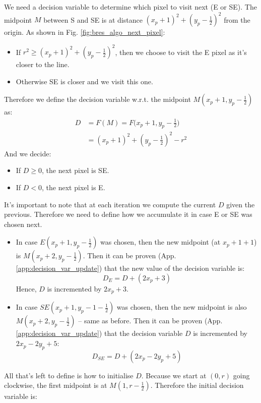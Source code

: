 \documentclass[a4paper]{article}
\begin{document}
We need a decision variable to determine which pixel to visit next (E or SE). The midpoint $M$ between S and SE is at distance $(x_p+1)^2 + (y_p - \tfrac{1}{2})^2$ from the origin. As shown in Fig. \ref{fig:bres_algo_next_pixel}:
\begin{itemize}
    \item If $r^2 \geq (x_p+1)^2 + (y_p - \tfrac{1}{2})^2$, then we choose to visit the E pixel as it's closer to the line.
    \item Otherwise SE is closer and we visit this one.
\end{itemize}
Therefore we define the decision variable w.r.t. the midpoint $M(x_p+1, y_p-\tfrac{1}{2})$ as:
\begin{align*}
    D &= F(M) = F\Bigg(x_p+1, y_p-\frac{1}{2}\Bigg)\\
    &= (x_p+1)^2 + (y_p-\frac{1}{2})^2 - r^2
\end{align*}
And we decide:
\begin{itemize}
    \item If $D\geq 0$, the next pixel is SE.
    \item If $D<0$, the next pixel is E.
\end{itemize}
It's important to note that at each iteration we compute the current $D$ given the previous. Therefore we need to define how we accumulate it in case E or SE was chosen next.
\begin{itemize}
    \item In case $E(x_p+1, y_p-\tfrac{1}{2})$ was chosen, then the new midpoint (at $x_p+1+1$) is $M(x_p+2, y_p-\frac{1}{2})$. Then it can be proven (App. \ref{app:decision_var_update}) that the new value of the decision variable is:
    \begin{equation}
    D_{E} = D + (2x_p + 3)
    \label{eq:de}
    \end{equation}
    Hence, $D$ is incremented by $2x_p + 3$.
    \item In case $SE(x_p+1, y_p-1-\tfrac{1}{2})$ was chosen, then the new midpoint is also $M(x_p+2, y_p-\frac{1}{2})$ -- same as before. Then it can be proven (App. \ref{app:decision_var_update}) that the decision variable $D$ is incremented by $2x_p-2y_p+5$:
    \begin{equation}
        D_{SE} = D + (2x_p-2y_p+5)    
        \label{eq:d_se}
    \end{equation}
    
\end{itemize}
All that's left to define is how to initialise $D$. Because we start at $(0, r)$ going clockwise, the first midpoint is at $M(1, r - \tfrac{1}{2})$. Therefore the initial decision variable is:
\end{document}
